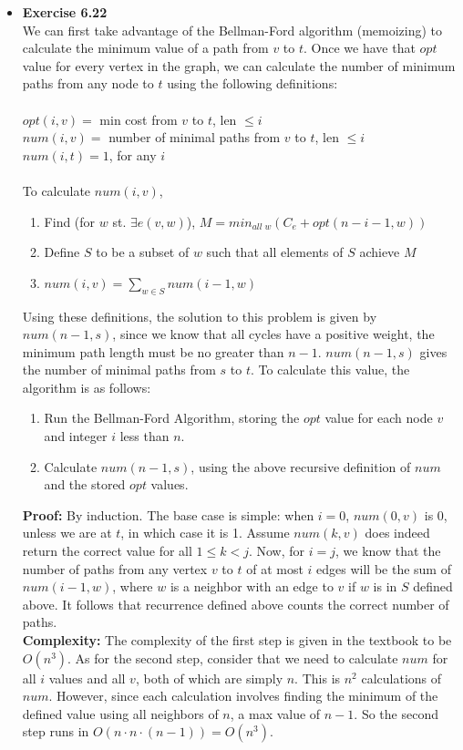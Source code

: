 \documentclass[a4paper]{article}
\begin{document}
\begin{itemize}
\item{\textbf{Exercise 6.22}} \\
We can first take advantage of the Bellman-Ford algorithm (memoizing) to calculate the minimum value of a path from $v$ to $t$. Once we have that $opt$ value for every vertex in the graph, we can calculate the number of minimum paths from any node to $t$ using the following definitions: \\
\\
$opt(i, v) =$ min cost from $v$ to $t$, len $\leq i$ \\
$num(i, v) =$ number of minimal paths from $v$ to $t$, len $\leq i$ \\
$num(i, t) = 1$, for any $i$ \\
\\
To calculate $num(i, v)$, 
\begin{enumerate}
\item Find (for $w$ st. $\exists e(v,w)$), $M = min_{all\;w}(C_e + opt(n-i-1, w))$
\item Define $S$ to be a subset of $w$ such that all elements of $S$ achieve $M$
\item $num(i,v) = \sum_{w \in S} num(i-1, w)$
\end{enumerate}
Using these definitions, the solution to this problem is given by $num(n-1, s)$, since we know that all cycles have a positive weight, the minimum path length must be no greater than $n-1$. $num(n-1, s)$ gives the number of minimal paths from $s$ to $t$. To calculate this value, the algorithm is as follows:
\begin{enumerate}
\item Run the Bellman-Ford Algorithm, storing the $opt$ value for each node $v$ and integer $i$ less than $n$.
\item Calculate $num(n-1, s)$, using the above recursive definition of $num$ and the stored $opt$ values.
\end{enumerate}
\textbf{Proof:} By induction. The base case is simple: when $i = 0$, $num(0, v)$ is 0, unless we are at $t$, in which case it is 1. Assume $num(k, v)$ does indeed return the correct value for all $1 \leq k < j$. Now, for $i = j$, we know that the number of paths from any vertex $v$ to $t$ of at most $i$ edges will be the sum of $num(i-1, w)$, where $w$ is a neighbor with an edge to $v$ if $w$ is in $S$ defined above. It follows that recurrence defined above counts the correct number of paths.\\ 
\textbf{Complexity:} The complexity of the first step is given in the textbook to be $O(n^3)$. As for the second step, consider that we need to calculate $num$ for all $i$ values and all $v$, both of which are simply $n$. This is $n^2$ calculations of $num$. However, since each calculation involves finding the minimum of the defined value using all neighbors of $n$, a max value of $n-1$. So the second step runs in $O(n \cdot n \cdot (n-1)) = O(n^3)$.
\\
\\



\end{itemize}
\end{document}
